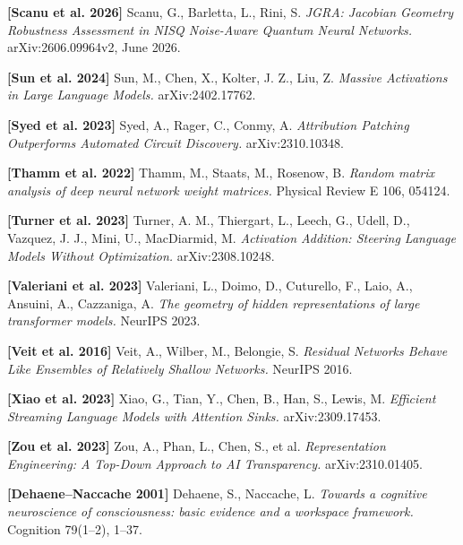 \documentclass[10pt,letterpaper,twocolumn]{article}
\begin{document}
\textbf{{[}Scanu et al. 2026{]}} Scanu, G., Barletta, L., Rini, S. \emph{JGRA: Jacobian Geometry Robustness Assessment in NISQ Noise-Aware Quantum Neural Networks.} arXiv:2606.09964v2, June 2026.

\textbf{{[}Sun et al. 2024{]}} Sun, M., Chen, X., Kolter, J. Z., Liu, Z. \emph{Massive Activations in Large Language Models.} arXiv:2402.17762.

\textbf{{[}Syed et al. 2023{]}} Syed, A., Rager, C., Conmy, A. \emph{Attribution Patching Outperforms Automated Circuit Discovery.} arXiv:2310.10348.

\textbf{{[}Thamm et al. 2022{]}} Thamm, M., Staats, M., Rosenow, B. \emph{Random matrix analysis of deep neural network weight matrices.} Physical Review E 106, 054124.

\textbf{{[}Turner et al. 2023{]}} Turner, A. M., Thiergart, L., Leech, G., Udell, D., Vazquez, J. J., Mini, U., MacDiarmid, M. \emph{Activation Addition: Steering Language Models Without Optimization.} arXiv:2308.10248.

\textbf{{[}Valeriani et al. 2023{]}} Valeriani, L., Doimo, D., Cuturello, F., Laio, A., Ansuini, A., Cazzaniga, A. \emph{The geometry of hidden representations of large transformer models.} NeurIPS 2023.

\textbf{{[}Veit et al. 2016{]}} Veit, A., Wilber, M., Belongie, S. \emph{Residual Networks Behave Like Ensembles of Relatively Shallow Networks.} NeurIPS 2016.

\textbf{{[}Xiao et al. 2023{]}} Xiao, G., Tian, Y., Chen, B., Han, S., Lewis, M. \emph{Efficient Streaming Language Models with Attention Sinks.} arXiv:2309.17453.

\textbf{{[}Zou et al. 2023{]}} Zou, A., Phan, L., Chen, S., et al. \emph{Representation Engineering: A Top-Down Approach to AI Transparency.} arXiv:2310.01405.

\textbf{{[}Dehaene--Naccache 2001{]}} Dehaene, S., Naccache, L. \emph{Towards a cognitive neuroscience of consciousness: basic evidence and a workspace framework.} Cognition 79(1--2), 1--37.
\end{document}
